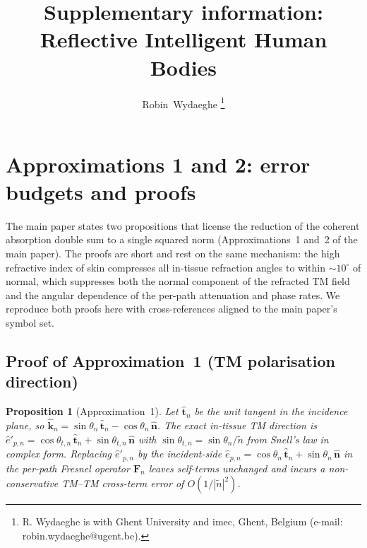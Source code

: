 \documentclass[10pt,journal,twocolumn]{IEEEtran}
\title{Supplementary information:\\
Reflective Intelligent Human Bodies}
\author{Robin~Wydaeghe%
  \thanks{R. Wydaeghe is with Ghent University and imec, Ghent, Belgium
  (e-mail: robin.wydaeghe@ugent.be).}}
\newcommand{\nhat}{\hat{\bm{n}}}
\newcommand{\Fn}{\mathbf{F}_n}
\newcommand{\ntilde}{\tilde{n}}
\theoremstyle{plain}
\newtheorem{proposition}{Proposition}[section]
\theoremstyle{definition}
\begin{document}
\maketitle

\section{Approximations 1 and 2: error budgets and proofs}\label{si:approx-proofs}

The main paper states two propositions that license the reduction of
the coherent absorption double sum to a single squared norm
(Approximations~1 and~2 of the main paper). The proofs are short and rest on
the same mechanism: the high refractive index of skin compresses all
in-tissue refraction angles to within $\sim\!10^{\circ}$ of normal,
which suppresses both the normal component of the refracted TM field
and the angular dependence of the per-path attenuation and phase
rates. We reproduce both proofs here with cross-references aligned
to the main paper's symbol set.

\subsection{Proof of Approximation~1 (TM polarisation direction)}

\begin{proposition}[Approximation~1]\label{prop:S-approx1}
Let $\hat{\bm{t}}_n$ be the unit tangent in the incidence plane, so
$\hat{\bm{k}}_n = \sin\theta_n\,\hat{\bm{t}}_n - \cos\theta_n\,\nhat$.
The exact in-tissue TM direction is $\hat{e}'_{p,n} =
\cos\theta_{t,n}\,\hat{\bm{t}}_n + \sin\theta_{t,n}\,\nhat$ with
$\sin\theta_{t,n} = \sin\theta_n / \ntilde$ from Snell's law in
complex form. Replacing $\hat{e}'_{p,n}$ by the incident-side
$\hat{e}_{p,n} = \cos\theta_n\,\hat{\bm{t}}_n + \sin\theta_n\,\nhat$
in the per-path Fresnel operator $\Fn$ leaves self-terms unchanged
and incurs a non-conservative TM--TM cross-term error of
$O(1/|\ntilde|^2)$.
\end{proposition}
\end{document}
